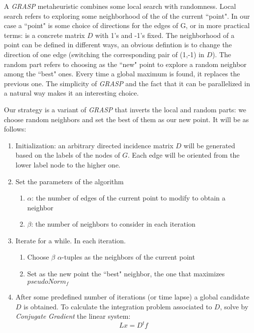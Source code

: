 \documentclass[a4paper,11pt]{article}
\begin{document}
A \textit{GRASP} metaheuristic combines some local search 
with randomness. Local search refers to exploring some neighborhood of 
the of the current ``point". In our case a ``point" is some choice of 
directions for the edges of G, or in more practical terms: is a 
concrete matrix $D$ with 1's and -1's fixed. The neighborhood of a 
point can be defined in different ways, an obvious defintion is to 
change the direction of one edge (switching the corresponding pair of 
(1,-1) in $D$). The random part refers to choosing as the ``new" point 
to explore a random neighbor among the ``best" ones. Every time a global 
maximum is found, it replaces the previous one. The simplicity of 
\textit{GRASP} and the fact that it can be parallelized in a natural 
way makes it an interesting choice.

\bigskip

Our strategy is a variant of \textit{GRASP} that inverts the local and 
random parts: we choose random neighbors and set the best of them as 
our new point. It will be as follows:

\begin{enumerate}
	\item Initialization: an arbitrary directed incidence matrix $D$ 
	will be generated based on the labels of the nodes of $G$. Each edge 
	will be oriented from the lower label node to the higher one. 
	\item Set the parameters of the algorithm
	\begin{enumerate}
		\item $\alpha$: the number of edges of the current point to 
		modify to obtain a neighbor
		\item $\beta$: the number of neighbors to consider in each 
		iteration
	\end{enumerate}
	\item Iterate for a while. In each iteration.
	\begin{enumerate}
		\item Choose $\beta$ $\alpha$-tuples as the neighbors of the
		current point
		\item Set as the new point the ``best" neighbor, the one that 
		maximizes $pseudoNorm_f$
 	\end{enumerate}
	\item After some predefined number of iterations (or time lapse) a  
	global candidate $D$ is obtained. To calculate the integration 
	problem associated to $D$, solve by \textit{Conjugate Gradient} 
	the linear system:
	$$L x = D^t f$$
\end{enumerate}
\end{document}
